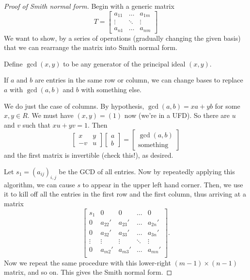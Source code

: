 \begin{proof}
	[Proof of Smith normal form]
	Begin with a generic matrix
	\[ T = \begin{bmatrix}
		a_{11} & \dots & a_{1m} \\
		\vdots & \ddots & \vdots \\
		a_{n1} & \dots & a_{nm}
	\end{bmatrix} \]
	We want to show, by a series of operations (gradually changing the given basis)
	that we can rearrange the matrix into Smith normal form.

	Define $\gcd(x,y)$ to be any generator of the principal ideal $(x,y)$.
	\begin{claim}
		If $a$ and $b$ are entries in the same row or column,
		we can change bases to replace $a$ with $\gcd(a,b)$
		and $b$ with something else.
	\end{claim}
	\begin{subproof}
		We do just the case of columns.
		By hypothesis, $\gcd(a,b) = xa+yb$ for some $x,y \in R$.
		We must have $(x,y) = (1)$ now (we're in a UFD).
		So there are $u$ and $v$ such that $xu + yv = 1$.
		Then
		\[
			\begin{bmatrix} x & y \\ -v & u \end{bmatrix}
			\begin{bmatrix} a \\ b  \end{bmatrix}
			= \begin{bmatrix} \gcd(a,b) \\ \text{something} \end{bmatrix}
		\]
		and the first matrix is invertible (check this!), as desired.
	\end{subproof}
	Let $s_1 = (a_{ij})_{i,j}$ be the GCD of all entries.
	Now by repeatedly applying this algorithm,
	we can cause $s$ to appear in the upper left hand corner.
	Then, we use it to kill off all the entries in the first
	row and the first column, thus arriving at a matrix
	\[ \begin{bmatrix}
		s_1 & 0 & 0 & \dots & 0 \\
		0 & a_{22}' & a_{23}' & \dots & a_{2n}' \\
		0 & a_{32}' & a_{33}' & \dots & a_{3n}' \\
		\vdots&\vdots&\vdots&\ddots&\vdots \\
		0 & a_{m2}' & a_{m3}' & \dots & a_{mn}' \\
	\end{bmatrix}. \]
	Now we repeat the same procedure with this lower-right
	$(m-1) \times (n-1)$ matrix, and so on.
	This gives the Smith normal form.
\end{proof}

